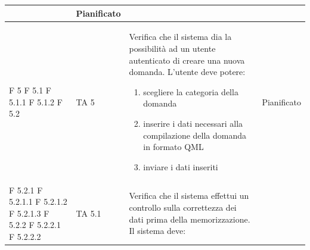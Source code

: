 \documentclass[a4paper,11pt]{article}
\begin{document}
\begin{longtable}{p{}p{}p{}p{}}
\begin{enumerate}
\end{enumerate} & Pianificato\\
\midrule
F 5 \newline F 5.1 \newline F 5.1.1 \newline F 5.1.2 \newline F 5.2& TA 5&Verifica che il sistema dia la possibilità ad un utente autenticato di creare una nuova domanda. \newline
L'utente deve potere:
\begin{enumerate}
\item scegliere la categoria della domanda
\item inserire i dati necessari alla compilazione della domanda in formato QML
\item inviare i dati inseriti 
\end{enumerate} & Pianificato\\
\midrule
F 5.2.1 \newline F 5.2.1.1 \newline F 5.2.1.2 \newline F 5.2.1.3 \newline F 5.2.2 \newline F 5.2.2.1 \newline F 5.2.2.2 \newline & TA 5.1&Verifica che il sistema effettui un controllo sulla correttezza dei dati prima della memorizzazione. Il sistema deve: 

\end{longtable}
\end{document}
